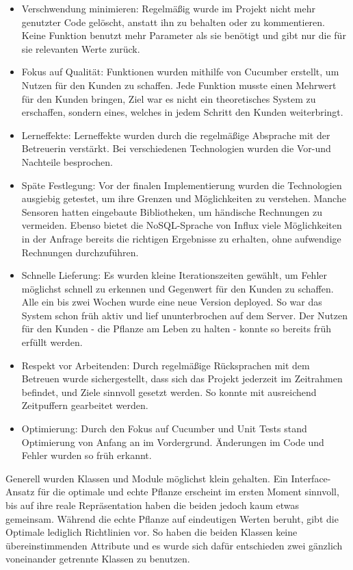 \begin{itemize}
    \item Verschwendung minimieren: Regelmäßig wurde im Projekt nicht mehr genutzter Code gelöscht, anstatt ihn zu behalten oder zu kommentieren. Keine Funktion benutzt mehr Parameter als sie benötigt und gibt nur die für sie relevanten Werte zurück.
    \item Fokus auf Qualität: Funktionen wurden mithilfe von Cucumber erstellt, um Nutzen für den Kunden zu schaffen. Jede Funktion musste einen Mehrwert für den Kunden bringen, Ziel war es nicht ein theoretisches System zu erschaffen, sondern eines, welches in jedem Schritt den Kunden weiterbringt.
    \item Lerneffekte: Lerneffekte wurden durch die regelmäßige Absprache mit der Betreuerin verstärkt. Bei verschiedenen Technologien wurden die Vor-und Nachteile besprochen.
    \item Späte Festlegung: Vor der finalen Implementierung wurden die Technologien ausgiebig getestet, um ihre Grenzen und Möglichkeiten zu verstehen. Manche Sensoren hatten eingebaute Bibliotheken, um händische Rechnungen zu vermeiden. Ebenso bietet die NoSQL-Sprache von Influx viele Möglichkeiten in der Anfrage bereits die richtigen Ergebnisse zu erhalten, ohne aufwendige Rechnungen durchzuführen.
    \item Schnelle Lieferung: Es wurden kleine Iterationszeiten gewählt, um Fehler möglichst schnell zu erkennen und Gegenwert für den Kunden zu schaffen. Alle ein bis zwei Wochen wurde eine neue Version deployed. So war das System schon früh aktiv und lief ununterbrochen auf dem Server. Der Nutzen für den Kunden - die Pflanze am Leben zu halten - konnte so bereits früh erfüllt werden.
    \item Respekt vor Arbeitenden: Durch regelmäßige Rücksprachen mit dem Betreuen wurde sichergestellt, dass sich das Projekt jederzeit im Zeitrahmen befindet, und Ziele sinnvoll gesetzt werden. So konnte mit ausreichend Zeitpuffern gearbeitet werden.
    \item Optimierung: Durch den Fokus auf Cucumber und Unit Tests stand Optimierung von Anfang an im Vordergrund. Änderungen im Code und Fehler wurden so früh erkannt.
\end{itemize}

Generell wurden  Klassen und Module möglichst klein gehalten. Ein Interface-Ansatz für die optimale und echte Pflanze erscheint im ersten Moment sinnvoll, bis auf ihre reale Repräsentation haben die beiden jedoch kaum etwas gemeinsam. Während die echte Pflanze auf eindeutigen Werten beruht, gibt die Optimale lediglich Richtlinien vor. So haben die beiden Klassen keine übereinstimmenden Attribute und es wurde sich dafür entschieden zwei gänzlich voneinander getrennte Klassen zu benutzen.

